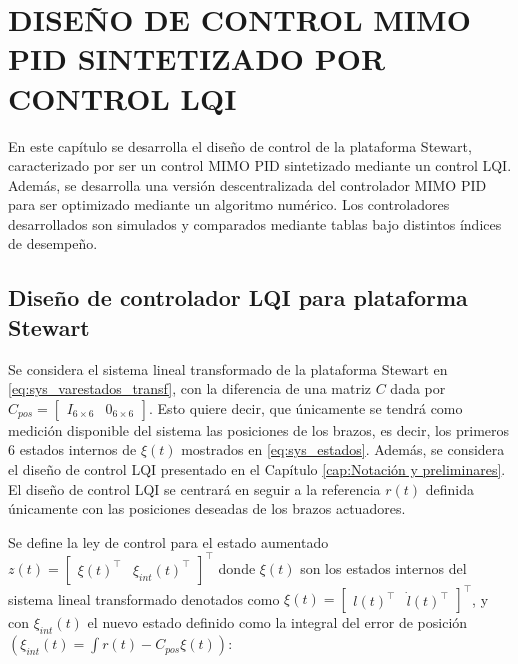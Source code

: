 \chapter{DISEÑO DE CONTROL MIMO PID SINTETIZADO POR CONTROL LQI}
\label{cap:mimoPID} 
\renewcommand{\proofname}{Demostración}

En este capítulo se desarrolla el diseño de control de la plataforma Stewart, caracterizado por ser un control MIMO PID sintetizado mediante un control LQI. Además, se desarrolla una versión descentralizada del controlador MIMO PID para ser optimizado mediante un algoritmo numérico. Los controladores desarrollados son simulados y comparados mediante tablas bajo distintos índices de desempeño.

\section{Diseño de controlador LQI para plataforma Stewart}
\label{sec:lqi_stewart}

Se considera el sistema lineal transformado de la plataforma Stewart en \ref{eq:sys_varestados_transf}, con la diferencia de una matriz $C$ dada por $C_{pos}=\begin{bmatrix} I_{6\times6} & 0_{6\times6}\end{bmatrix}$. Esto quiere decir, que únicamente se tendrá como medición disponible del sistema las posiciones de los brazos, es decir, los primeros 6 estados internos de $\xi(t)$ mostrados en \ref{eq:sys_estados}. Además, se considera el diseño de control LQI presentado en el Capítulo \ref{cap:Notación y preliminares}. El diseño de control LQI se centrará en seguir a la referencia $r(t)$ definida únicamente con las posiciones deseadas de los brazos actuadores.  

Se define la ley de control para el estado aumentado $z(t)=\begin{bmatrix} \xi(t)^{\top} & \xi_{int}(t)^{\top} \end{bmatrix}^{\top}$ donde $\xi(t)$ son los estados internos del sistema lineal transformado denotados como $\xi(t) = \begin{bmatrix} l(t)^{\top} & \dot{l}(t)^{\top} \end{bmatrix}^{\top}$, y con $\xi_{int}(t)$ el nuevo estado definido como la integral del error de posición $\left(\xi_{int}(t)=\int r(t) - C_{pos} \xi(t)\right)$:


